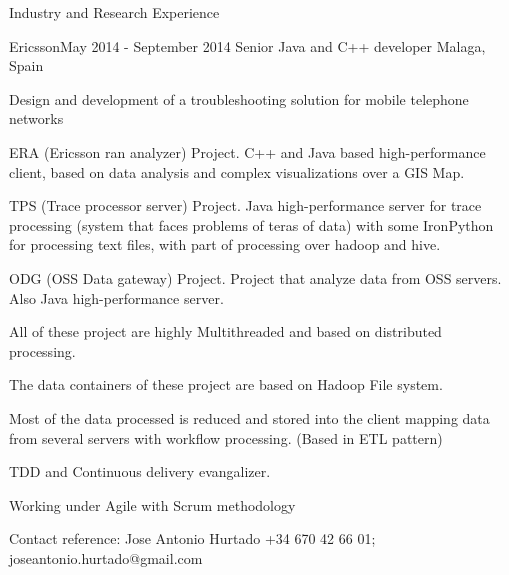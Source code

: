 \documentclass{resume} %
\begin{document}
\begin{rSection}{Industry and Research Experience}

\begin{rSubsection}{Ericsson}{May 2014 - September 2014 }{ Senior Java and C++ developer }{Malaga, Spain}
	\item Design and development of a troubleshooting solution for mobile telephone networks
	\item ERA (Ericsson ran analyzer) Project. C++ and Java based high-performance client, based on data analysis and complex visualizations over a GIS Map.
	\item TPS (Trace processor server) Project. Java high-performance server for trace processing (system that faces problems of teras of data) with some IronPython for processing text files, with part of processing over hadoop and hive.
	\item ODG (OSS Data gateway) Project. Project that analyze data from OSS servers. Also Java high-performance server. 
	\item All of these project are highly Multithreaded and based on distributed processing. 
	\item The data containers of these project are based on Hadoop File system. 
	\item Most of the data processed is reduced and stored into the client mapping data from several servers with workflow processing. (Based in ETL pattern)
	\item TDD and Continuous delivery evangalizer.
	\item Working under Agile with Scrum methodology
	\item Contact reference: Jose Antonio Hurtado +34 670 42 66 01; joseantonio.hurtado@gmail.com
	
\end{rSubsection}



\end{rSection}
\end{document}

